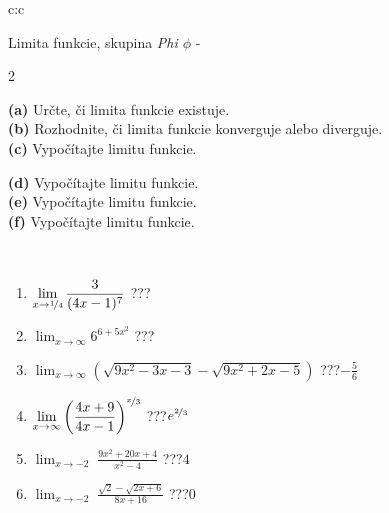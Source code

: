 \documentclass[10pt]{report}
\begin{document}
\newpage
\thispagestyle{empty}
\begin{tabular}{c:c}
\begin{minipage}[c][104.5mm][t]{0.5\linewidth}
\begin{center}
\vspace{7mm}
{\huge Limita funkcie, skupina \textit{Phi $\phi$} -}\\[5mm]
\begin{minipage}{0.95\linewidth}
\begin{center}
{\small \begin{multicols}{2} \raggedright
\textbf{(a)} Určte, či limita funkcie existuje. \\[1mm]
\textbf{(b)} Rozhodnite, či limita funkcie konverguje alebo diverguje. \\[1mm]
\textbf{(c)} Vypočítajte limitu funkcie. \par \columnbreak
\textbf{(d)} Vypočítajte limitu funkcie. \\[1mm]
\textbf{(e)} Vypočítajte limitu funkcie. \\[1mm]
\textbf{(f)} Vypočítajte limitu funkcie. \\[1mm]
\end{multicols}
}
\end{center}
\end{minipage}
\\[4mm]
\begin{minipage}{0.79\linewidth}
\begin{center}
\begin{varwidth}{\linewidth}
\begin{enumerate}
\normalsize
\item $\displaystyle\lim_{x\to\nicefrac{1}{4}}{\frac{3}{(4x-1)^{7}}}$\quad \dotfill\; ???\;\dotfill \quad {}
\item $\displaystyle\lim_{x\to\infty}{6^{6+5x^2}}$\quad \dotfill\; ???\;\dotfill \quad {}
\item $\displaystyle\lim_{x\to\infty}{\left(\sqrt{9x^2-3x-3} - \sqrt{9x^2+2x-5}\right)}$\quad \dotfill\; ???\;\dotfill \quad $-\frac{5}{6}$
\item $\displaystyle\lim_{x\to\infty}{\left( \frac{4x+9}{4x-1} \right)^{\nicefrac{x}{3}}}$\quad \dotfill\; ???\;\dotfill \quad $e^{\nicefrac{2}{3}}$
\item $\displaystyle\lim_{x\to -2}{\;\frac{9x^2+20x+4}{x^2-4}}$\quad \dotfill\; ???\;\dotfill \quad $4$
\item $\displaystyle\lim_{x\to -2}{\;\frac{\sqrt{2}-\sqrt{2x+6}}{8x+16}}$\quad \dotfill\; ???\;\dotfill \quad $0$

\end{enumerate}
\end{varwidth}
\end{center}
\end{minipage}
\end{center}
\end{minipage}
\end{tabular}
\end{document}
